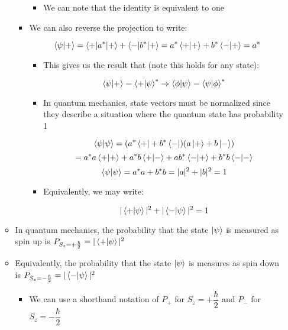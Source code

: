 \begin{itemize}
\begin{itemize}
\begin{itemize}
\begin{itemize}
              \item We can note that the identity is equivalent to one

            \end{itemize}

          \item We can also reverse the projection to write:

            $$\bra{\psi}\ket{+}=\bra{+|a^*}\ket{+}+\bra{-|b^*}\ket{+}=a^*\braket{+}+b^*\bra{-}\ket{+}=a^*$$

            \begin{itemize}

              \item This gives us the result that (note this holds for any state):

                $$\bra{\psi}\ket{+}=\bra{+}\ket{\psi}^*\Rightarrow \bra{\phi}\ket{\psi}=\bra{\psi}\ket{\phi}^*$$

              \item In quantum mechanics, state vectors must be normalized since they describe a situation where the quantum state has probability 1

                $$\braket{\psi}=(a^*\bra{+}+b^*\bra{-})(a\ket{+}+b\ket{-})$$
                $$=a^*a\braket{+}+a^*b\bra{+}\ket{-}+ab^*\bra{-}\ket{+}+b^*b\braket{-}$$
                $$\braket{\psi}=a^*a+b^*b=|a|^2+|b|^2=1$$

              \item Equivalently, we may write:

                $$|\bra{+}\ket{\psi}|^2+|\bra{-}\ket{\psi}|^2=1$$

            \end{itemize}

        \end{itemize}

      \item In quantum mechanics, the probability that the state $\ket{\psi}$ is measured as spin up is $P_{S_z=+\frac{\hbar}{2}}=|\bra{+}\ket{\psi}|^2$

      \item Equivalently, the probability that the state $\ket{\psi}$ is measures as spin down is $P_{S_z=-\frac{\hbar}{2}}=|\bra{-}\ket{\psi}|^2$

        \begin{itemize}

          \item We can use a shorthand notation of $P_+$ for $S_z=+\dfrac{\hbar}{2}$ and $P_-$ for $S_z=-\dfrac{\hbar}{2}$


\end{itemize}
\end{itemize}
\end{itemize}
